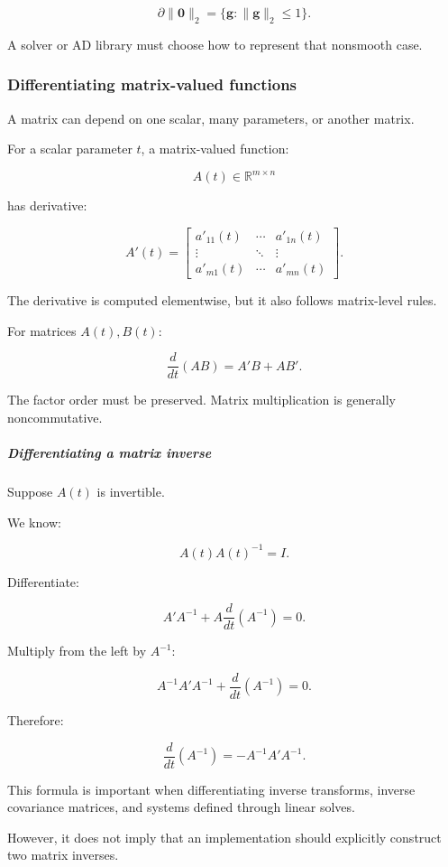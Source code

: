 \[
\partial\|\mathbf0\|_2= \{\mathbf g:\|\mathbf g\|_2\le1\}.
\]

A solver or AD library must choose how to represent that nonsmooth case.

\subsubsection{Differentiating matrix-valued functions}\label{differentiating-matrix-valued-functions}

A matrix can depend on one scalar, many parameters, or another matrix.

For a scalar parameter \(t\), a matrix-valued function:

\[
A(t)\in\mathbb R^{m\times n}
\]

has derivative:

\[
\boxed{ A'(t)= \begin{bmatrix} a'_{11}(t)&\cdots&a'_{1n}(t)\\ \vdots&\ddots&\vdots\\ a'_{m1}(t)&\cdots&a'_{mn}(t) \end{bmatrix} }.
\]

The derivative is computed elementwise, but it also follows matrix-level rules.

For matrices \(A(t),B(t)\):

\[
\boxed{ \frac d{dt}(AB)=A'B+AB' }.
\]

The factor order must be preserved. Matrix multiplication is generally noncommutative.

\subparagraph{Differentiating a matrix inverse}\label{differentiating-a-matrix-inverse}

Suppose \(A(t)\) is invertible.

We know:

\[
A(t)A(t)^{-1}=I.
\]

Differentiate:

\[
A'A^{-1} + A\frac d{dt}(A^{-1}) =0.
\]

Multiply from the left by \(A^{-1}\):

\[
A^{-1}A'A^{-1} + \frac d{dt}(A^{-1}) =0.
\]

Therefore:

\[
\boxed{ \frac d{dt}(A^{-1}) = -A^{-1}A'A^{-1} }.
\]

This formula is important when differentiating inverse transforms, inverse covariance matrices, and systems defined through linear solves.

However, it does not imply that an implementation should explicitly construct two matrix inverses.

